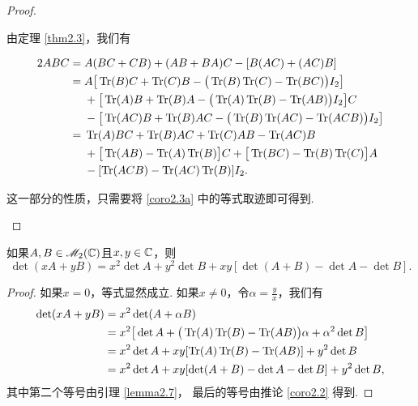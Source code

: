\begin{proof}
  \begin{enuma}
    \item 由定理 \ref{thm2.3}，我们有
  \end{enuma}
  \begin{align*}
    2ABC = {}& A(BC + CB) + (AB + BA)C - [B(AC) + (AC)B] \\
    = {}& A \big[ \operatorname{Tr}(B)C + \operatorname{Tr}(C)B - \big( \operatorname{Tr}(B)\operatorname{Tr}(C) -\operatorname{Tr}(BC) \big)I_2 \big]\\
        & + \big[ \operatorname{Tr}(A)B + \operatorname{Tr}(B)A - \big( \operatorname{Tr}(A)\operatorname{Tr}(B) -\operatorname{Tr}(AB) \big)I_2 \big]C \\
        & - \big[ \operatorname{Tr}(AC)B + \operatorname{Tr}(B)AC - \big( \operatorname{Tr}(B)\operatorname{Tr}(AC) -\operatorname{Tr}(ACB) \big)I_2 \big] \\
    = {}& \operatorname{Tr}(A)BC + \operatorname{Tr}(B)AC + \operatorname{Tr}(C)AB - \operatorname{Tr}(AC)B \\
        & + \big[
          \operatorname{Tr}(AB) - \operatorname{Tr}(A)\operatorname{Tr}(B)
        \big]C + \big[ \operatorname{Tr}(BC) - \operatorname{Tr}(B)\operatorname{Tr}(C) \big] A \\
        & - [\operatorname{Tr}(ACB) - \operatorname{Tr}(AC)\operatorname{Tr}(B)]I_2.
  \end{align*}

  \begin{enuma}
    \setcounter{enumi}{1}
    \item 这一部分的性质，只需要将 \ref{coro2.3a} 中的等式取迹即可得到.
  \end{enuma}
\end{proof}

\begin{mybox}
  \begin{corollary}[一个特殊系数的多项式.]

    如果$A,B\in\mathscr M_2(\mathbb C)$且$x,y\in\mathbb C$，则
    \[
      \det (xA + yB) = x^2\det A + y^2\det B + xy[ \det (A + B) - \det A - \det B].
    \]
  \end{corollary}
\end{mybox}

\begin{proof}
  如果$x=0$，等式显然成立. 如果$x\ne0$，令$\alpha=\frac yx$，我们有
  \begin{align*}
    \det (xA + yB) & = x^2 \det (A + \alpha B )\\
    & = x^2\big[ \det A + \big( \operatorname{Tr}(A)\operatorname{Tr}(B) - \operatorname{Tr}(AB)\big)\alpha +\alpha^2\det B  \big] \\
    & = x^2 \det A + xy[\operatorname{Tr}(A)\operatorname{Tr}(B) - \operatorname{Tr}(AB)] + y^2\det B \\
    & = x^2 \det A + xy[\det (A + B) - \det A - \det B] + y^2\det B,
  \end{align*}
  其中第二个等号由引理 \ref{lemma2.7}， 最后的等号由推论 \ref{coro2.2} 得到.
\end{proof}

